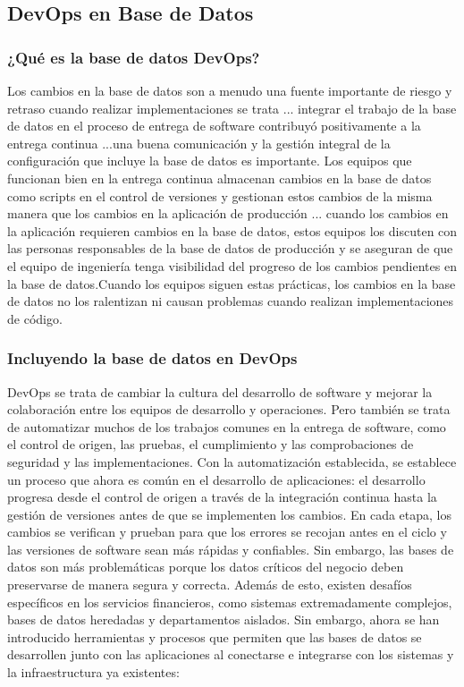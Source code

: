 \documentclass[preprint,12pt]{elsarticle}
\begin{document}

\subsection{\textbf{DevOps en Base de Datos}}

\subsubsection{\textbf{¿Qué es la base de datos DevOps?}}

Los cambios en la base de datos son a menudo una fuente importante de riesgo y retraso cuando realizar implementaciones se trata ... integrar el trabajo de la base de datos en el proceso de entrega de software contribuyó positivamente a la entrega continua ...una buena comunicación y la gestión integral de la configuración que incluye la base de datos es importante. Los equipos que funcionan bien en la entrega continua almacenan cambios en la base de datos como scripts en el control de versiones y gestionan estos cambios de la misma manera que los cambios en la aplicación de producción ... cuando los cambios en la aplicación requieren cambios en la base de datos, estos equipos los discuten con las personas responsables de la base de datos de producción y se aseguran de que el equipo de ingeniería tenga visibilidad del progreso de los cambios pendientes en la base de datos.Cuando los equipos siguen estas prácticas, los cambios en la base de datos no los ralentizan ni causan problemas cuando realizan implementaciones de código. \cite{DevopsBD}

\subsubsection{\textbf{Incluyendo la base de datos en DevOps}}

DevOps se trata de cambiar la cultura del desarrollo de software y mejorar la colaboración entre los equipos de desarrollo y operaciones. Pero también se trata de automatizar muchos de los trabajos comunes en la entrega de software, como el control de origen, las pruebas, el cumplimiento y las comprobaciones de seguridad y las implementaciones. Con la automatización establecida, se establece un proceso que ahora es común en el desarrollo de aplicaciones: el desarrollo progresa desde el control de origen a través de la integración continua hasta la gestión de versiones antes de que se implementen los cambios. En cada etapa, los cambios se verifican y prueban para que los errores se recojan antes en el ciclo y las versiones de software sean más rápidas y confiables. Sin embargo, las bases de datos son más problemáticas porque los datos críticos del negocio deben preservarse de manera segura y correcta. Además de esto, existen desafíos específicos en los servicios financieros, como sistemas extremadamente complejos, bases de datos heredadas y departamentos aislados. Sin embargo, ahora se han introducido herramientas y procesos que permiten que las bases de datos se desarrollen junto con las aplicaciones al conectarse e integrarse con los sistemas y la infraestructura ya existentes: \cite{DevopsBD2} \\
\end{document}

